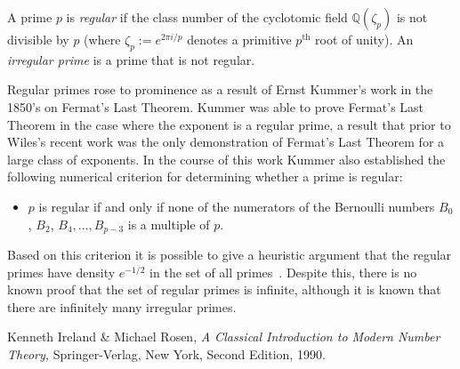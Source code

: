 \documentclass[12pt]{article}
\begin{document}
A prime $p$ is {\em regular} if the class number of the cyclotomic field $\mathbb{Q}(\zeta_p)$ is not divisible by $p$ (where $\zeta_p := e^{2 \pi i/p}$ denotes a primitive $p^\mathrm{th}$ root of unity). An {\em irregular prime} is a prime that is not regular.

Regular primes rose to prominence as a result of Ernst Kummer's work in the 1850's on Fermat's Last Theorem. Kummer was able to prove Fermat's Last Theorem in the case where the exponent is a regular prime, a result that prior to Wiles's recent work was the only demonstration of Fermat's Last Theorem for a large class of exponents. In the course of this work Kummer also established the following numerical criterion for determining whether a prime is regular:

\begin{itemize}
\item $p$ is regular if and only if none of the numerators of the Bernoulli numbers $B_0$, $B_2$, $B_4, \ldots, B_{p-3}$ is a multiple of $p$.
\end{itemize}

Based on this criterion it is possible to give a heuristic argument that the regular primes have density $e^{-1/2}$ in the set of all primes~\cite{ir}. Despite this, there is no known proof that the set of regular primes is infinite, although it is known that there are infinitely many irregular primes.

\begin{thebibliography}{9}
 Kenneth Ireland \& Michael Rosen, \emph{A
Classical Introduction to Modern Number Theory,} Springer-Verlag, New
York, Second Edition, 1990.
\end{thebibliography}
\end{document}
